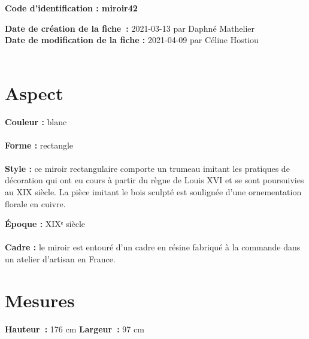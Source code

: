 
      {\bf \huge Code d’identification : miroir42} \\
    \newline \hr \begin{center} 
       
    \end{center} 
    {\bf \large Date de création de la fiche :} 2021-03-13
    {par Daphné Mathelier} 
    \\ {\bf \large Date de modification de la fiche :} 2021-04-09
    {par Céline Hostiou} \\ \\ \hr 
    \section* {Aspect} 
    {\bf \large Couleur :} blanc
    \\ \\ {\bf \large Forme :} rectangle 
    \\ \\ {\bf \large Style :} ce miroir rectangulaire comporte un trumeau imitant les
            pratiques de décoration qui ont eu cours à partir du règne de Louis XVI et se sont poursuivies au XIX siècle. La pièce imitant le bois sculpté est soulignée d'une
            ornementation florale en cuivre.
        
        {\bf \large Époque :} XIXᵉ siècle 
    \\ \\ {\bf \large Cadre :} le miroir est entouré d'un cadre en résine fabriqué à la commande dans un atelier d’artisan en France.
         
    \section* {Mesures}
     {\bf \large Hauteur :} 176 cm
   {\bf \large Largeur :} 97 cm
